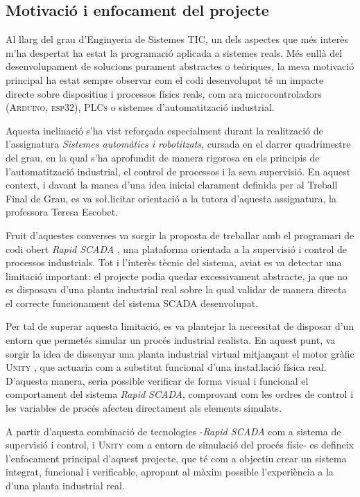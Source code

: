 \documentclass[a4paper,11pt,DIV=13,headings=normal,abstract=true,twoside=semi]{article}
\newcommand{\acro}[1]{\textsc{#1}}
\begin{document}
\subsection{Motivació i enfocament del projecte}

Al llarg del grau d'Enginyeria de Sistemes \acro{TIC}, un dels aspectes que més interès m'ha despertat ha estat la programació aplicada a sistemes reals. Més enllà del desenvolupament de solucions purament abstractes o teòriques, la meva motivació principal ha estat sempre observar com el codi desenvolupat té un impacte directe sobre dispositius i processos físics reals, com ara microcontroladors (\acro{Arduino}, \acro{esp32}), \acro{PLCs} o sistemes d'automatització industrial.

Aquesta inclinació s'ha vist reforçada especialment durant la realització de l'assignatura \emph{Sistemes automàtics i robotitzats}, cursada en el darrer quadrimestre del grau, en la qual s'ha aprofundit de manera rigorosa en els principis de l'automatització industrial, el control de processos i la seva supervisió. En aquest context, i davant la manca d'una idea inicial clarament definida per al Treball Final de Grau, es va so\l.licitar orientació a la tutora d'aquesta assignatura, la professora Teresa Escobet.

Fruit d'aquestes converses va sorgir la proposta de treballar amb el programari de codi obert \emph{Rapid SCADA} \cite{RapidScada}, una plataforma orientada a la supervisió i control de processos industrials. Tot i l'interès tècnic del sistema, aviat es va detectar una limitació important: el projecte podia quedar excessivament abstracte, ja que no es disposava d'una planta industrial real sobre la qual validar de manera directa el correcte funcionament del sistema \acro{SCADA} desenvolupat.

Per tal de superar aquesta limitació, es va plantejar la necessitat de disposar d'un entorn que permetés simular un procés industrial realista. En aquest punt, va sorgir la idea de dissenyar una planta industrial virtual mitjançant el motor gràfic \acro{Unity} \cite{Unity}, que actuaria com a substitut funcional d'una insta\l.lació física real. D'aquesta manera, seria possible verificar de forma visual i funcional el comportament del sistema \emph{Rapid SCADA}, comprovant com les ordres de control i les variables de procés afecten directament als elements simulats.

A partir d'aquesta combinació de tecnologies -\emph{Rapid SCADA} com a sistema de supervisió i control, i \acro{Unity} com a entorn de simulació del procés físic- es defineix l'enfocament principal d'aquest projecte, que té com a objectiu crear un sistema integrat, funcional i verificable, apropant al màxim possible l'experiència a la d'una planta industrial real.
\end{document}
